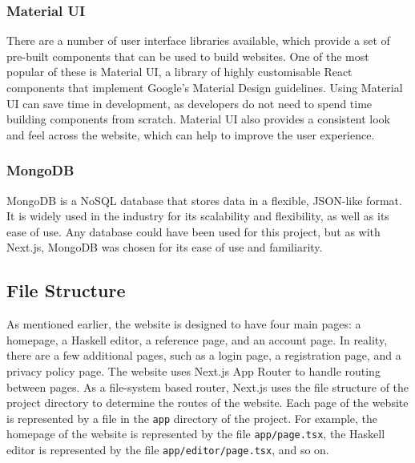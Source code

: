 \documentclass[../main.tex]{subfiles}
\begin{document}
            \subsubsection{Material UI}
                There are a number of user interface libraries available, which provide a set
                    of pre-built components that can be used to build websites.
                One of the most popular of these is Material UI, a library of highly
                    customisable React components that implement Google's Material Design
                    guidelines.
                Using Material UI can save time in development, as developers do not need to
                    spend time building components from scratch.
                Material UI also provides a consistent look and feel across the website, which
                    can help to improve the user experience.

            \subsubsection{MongoDB}
                MongoDB is a NoSQL database that stores data in a flexible, JSON-like format.
                It is widely used in the industry for its scalability and flexibility, as well
                    as its ease of use.
                Any database could have been used for this project, but as with Next.js,
                    MongoDB was chosen for its ease of use and familiarity.

        \subsection{File Structure}
            As mentioned earlier, the website is designed to have four main pages: a
                homepage, a Haskell editor, a reference page, and an account page.
            In reality, there are a few additional pages, such as a login page, a
                registration page, and a privacy policy page.
            The website uses Next.js App Router to handle routing between pages.
            As a file-system based router, Next.js uses the file structure of the project
                directory to determine the routes of the website.
            Each page of the website is represented by a file in the \texttt{app} directory
                of the project.
            For example, the homepage of the website is represented by the file
                \texttt{app/page.tsx}, the Haskell editor is represented by the file
                \texttt{app/editor/page.tsx}, and so on.
\end{document}

